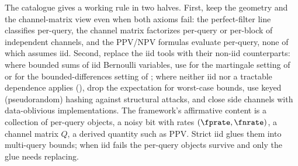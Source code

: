 The catalogue gives a working rule in two halves. First, keep the
geometry and the channel-matrix view even when both axioms fail: the
perfect-filter line classifies per-query, the channel matrix factorizes
per-query or per-block of independent channels, and the PPV/NPV formulas
evaluate per-query, none of which assumes iid. Second, replace the iid
tools with their non-iid counterparts: where  bounded
sums of iid Bernoulli variables, use  for the
martingale setting of  or 
for the bounded-differences setting of ; where
neither iid nor a tractable dependence applies
(), drop the expectation for worst-case
bounds, use keyed (pseudorandom) hashing against structural attacks, and
close side channels with data-oblivious implementations. The framework's affirmative content is a collection of
per-query objects, a noisy bit with rates $(\fprate, \fnrate)$, a channel
matrix $Q$, a derived quantity such as PPV. Strict iid glues them into
multi-query bounds; when iid fails the per-query objects survive and only
the glue needs replacing.
